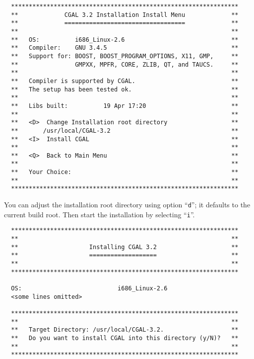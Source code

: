 {\ccTexHtml{\scriptsize}{}
\begin{verbatim}
  ****************************************************************
  **             CGAL 3.2 Installation Install Menu             **
  **             ==================================             **
  **                                                            **
  **   OS:          i686_Linux-2.6                              **
  **   Compiler:    GNU 3.4.5                                   **
  **   Support for: BOOST, BOOST_PROGRAM_OPTIONS, X11, GMP,     **
  **                GMPXX, MPFR, CORE, ZLIB, QT, and TAUCS.     **
  **                                                            **
  **   Compiler is supported by CGAL.                           **
  **   The setup has been tested ok.                            **
  **                                                            **
  **   Libs built:          19 Apr 17:20                        **
  **                                                            **
  **   <D>  Change Installation root directory                  **
  **       /usr/local/CGAL-3.2                                  **
  **   <I>  Install CGAL                                        **
  **                                                            **
  **   <Q>  Back to Main Menu                                   **
  **                                                            **
  **   Your Choice:                                             **
  **                                                            **
  ****************************************************************
\end{verbatim}
}

You can adjust the installation root directory using option
``\texttt{d}''; it defaults to the current build root. Then start the
installation by selecting ``\texttt{i}''.

{\ccTexHtml{\scriptsize}{}
\begin{verbatim}
  ****************************************************************
  **                                                            **
  **                    Installing CGAL 3.2                     **
  **                    ===================                     **
  **                                                            **
  ****************************************************************

  OS:                           i686_Linux-2.6
  <some lines omitted>

  ****************************************************************
  **                                                            **
  **   Target Directory: /usr/local/CGAL-3.2.                   **
  **   Do you want to install CGAL into this directory (y/N)?   **
  **                                                            **
  ****************************************************************
\end{verbatim}
}

